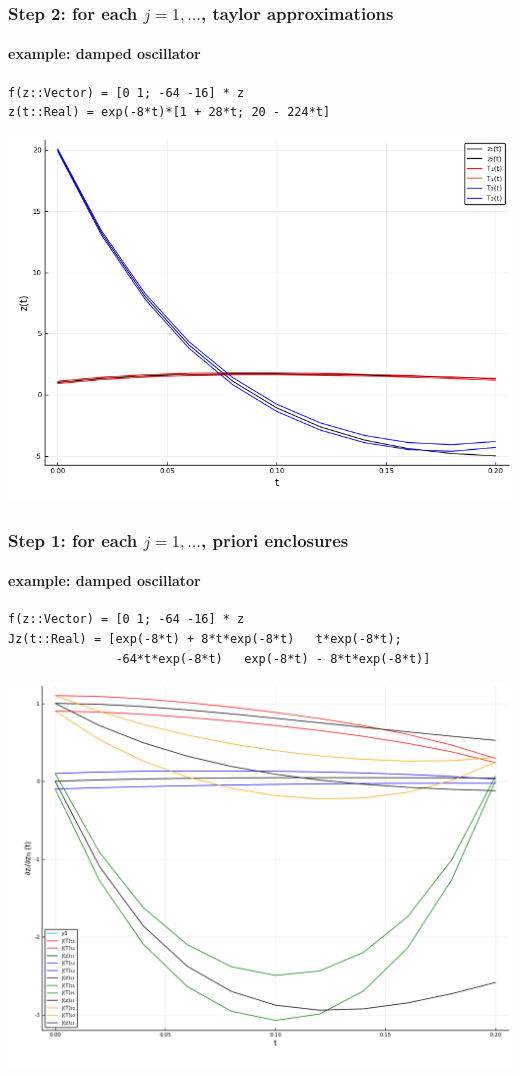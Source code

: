 \documentclass{beamer}
\begin{document}

\begin{frame}[fragile]
    \frametitle{Step 2: for each $j = 1,\ldots$, taylor approximations}
    \framesubtitle{example: damped oscillator}
    
\begin{verbatim}
f(z::Vector) = [0 1; -64 -16] * z
z(t::Real) = exp(-8*t)*[1 + 28*t; 20 - 224*t]
\end{verbatim}

    \includegraphics[width=0.9\textheight]{affine_tm_x.png}

\end{frame}

\begin{frame}[fragile]
    \frametitle{Step 1: for each $j = 1,\ldots$, priori enclosures}
    \framesubtitle{example: damped oscillator}
    
\begin{Verbatim}[fontsize=\small]
f(z::Vector) = [0 1; -64 -16] * z
Jz(t::Real) = [exp(-8*t) + 8*t*exp(-8*t)   t*exp(-8*t);
               -64*t*exp(-8*t)   exp(-8*t) - 8*t*exp(-8*t)]
\end{Verbatim}

    \includegraphics[width=0.9\textheight]{affine_tm_J.png}

\end{frame}
\end{document}
